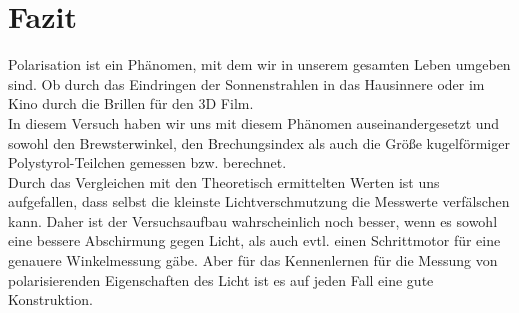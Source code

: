 

\chapter{Fazit}
\label{chap:fazit}


Polarisation ist ein Phänomen, mit dem wir in unserem gesamten Leben umgeben sind. Ob durch das Eindringen der Sonnenstrahlen in das Hausinnere oder im Kino durch die Brillen für den 3D Film. \\
In diesem Versuch haben wir uns mit diesem Phänomen auseinandergesetzt und sowohl den Brewsterwinkel, den Brechungsindex als auch die Größe kugelförmiger Polystyrol-Teilchen gemessen bzw. berechnet.\\
Durch das Vergleichen mit den Theoretisch ermittelten Werten ist uns aufgefallen, dass selbst die kleinste Lichtverschmutzung die Messwerte verfälschen kann. Daher ist der Versuchsaufbau wahrscheinlich noch besser, wenn es sowohl eine bessere Abschirmung gegen Licht, als auch evtl. einen Schrittmotor für eine genauere Winkelmessung gäbe. Aber für das Kennenlernen für die Messung von polarisierenden Eigenschaften des Licht ist es auf jeden Fall eine gute Konstruktion. 
